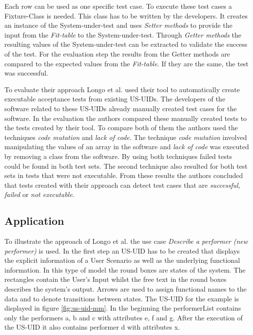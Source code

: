 Each row can be used as one specific test case.
To execute these test cases a Fixture-Class is needed.
This class has to be written by the developers.
It creates an instance of the System-under-test and uses \textit{Setter methods} to provide the input from the \textit{Fit-table} to the System-under-test.
Through \textit{Getter methods} the resulting values of the System-under-test can be extracted to validate the success of the test.
For the evaluation step the results from the Getter methods are compared to the expected values from the \textit{Fit-table}.
If they are the same, the test was successful.

To evaluate their approach Longo et al. used their tool to automatically create executable acceptance tests from existing US-UIDs.
The developers of the software related to these US-UIDs already manually created test cases for the software.
In the evaluation the authors compared these manually created tests to the tests created by their tool.
To compare both of them the authors used the techniques \textit{code mutation} and \textit{lack of code}.
The technique \textit{code mutation} involved manipulating the values of an array in the software and \textit{lack of code} was executed by removing a class from the software.
By using both techniques failed tests could be found in both test sets.
The second technique also resulted for both test sets in tests that were not executable.
From these results the authors concluded that tests created with their approach can detect test cases that are \textit{successful}, \textit{failed} or \textit{not executable}.

\subsection{Application}

To illustrate the approach of Longo et al. the use case \textit{Describe a performer (new performer)} is used.
In the first step an US-UID has to be created that displays the explicit information of a User Scenario as well as the underlying functional information.
In this type of model the round boxes are states of the system.
The rectangles contain the User's Input whilst the free text in the round boxes describes the system's output.
Arrows are used to assign functional names to the data and to denote transitions between states.
The US-UID for the example is displayed in figure \ref{fig:us-uid-mm}.
In the beginning the performerList contains only the performers a, b and c with attributes e, f and g.
After the execution of the US-UID it also contains performer d with attributes x.



